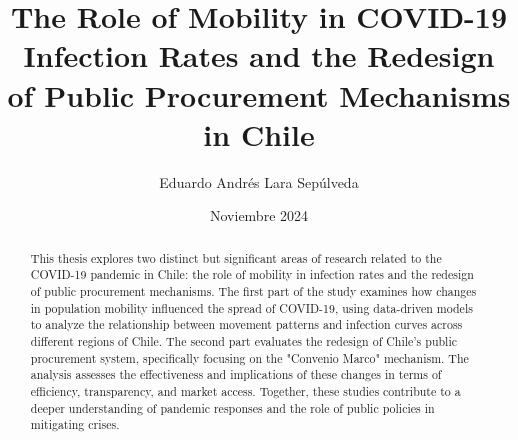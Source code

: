 \documentclass[upright, contnum]{umemoria}
\author{Eduardo Andrés Lara Sepúlveda}
\title{The Role of Mobility in COVID-19 Infection Rates and the Redesign of Public Procurement Mechanisms in Chile}
\date{Noviembre 2024}
\begin{document}
\frontmatter
\maketitle

\begin{abstract}
{This thesis explores two distinct but significant areas of research 
related to the COVID-19 pandemic in Chile: the role of mobility in 
infection rates and the redesign of public procurement mechanisms. 
The first part of the study examines how changes in population mobility 
influenced the spread of COVID-19, using data-driven models to analyze 
the relationship between movement patterns and infection curves across 
different regions of Chile. The second part evaluates the redesign of 
Chile's public procurement system, specifically focusing on the 
"Convenio Marco" mechanism. The analysis assesses the effectiveness 
and implications of these changes in terms of efficiency, transparency, 
and market access. Together, these studies contribute to a deeper 
understanding of pandemic responses and the role of public policies 
in mitigating crises.}
\end{abstract}

\begin{dedicatoria} %
\end{dedicatoria}

\cleardoublepage

\tableofcontents
\listoftables %
\listoffigures %


% 
% 
% 
% 





\end{document}
